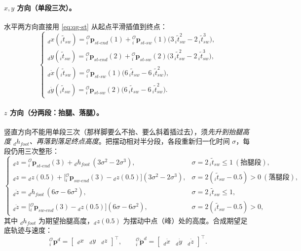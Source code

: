 \paragraph{$x,y$ 方向（单段三次）。}
水平两方向直接用 \cref{eq:qg-st} 从起点平滑插值到终点\cite{yu2021quadruped}：
\begin{equation}
  \begin{cases}
  {}_dx({}_i\tilde t_{sw})={}_i^{\mathcal{O}}\boldsymbol{p}_{st\text{-}end}(1)+{}_i^{\mathcal{O}}\boldsymbol{p}_{st\text{-}sw}(1)\big(3\,{}_i\tilde t_{sw}^2-2\,{}_i\tilde t_{sw}^3\big),\\
  {}_dy({}_i\tilde t_{sw})={}_i^{\mathcal{O}}\boldsymbol{p}_{st\text{-}end}(2)+{}_i^{\mathcal{O}}\boldsymbol{p}_{st\text{-}sw}(2)\big(3\,{}_i\tilde t_{sw}^2-2\,{}_i\tilde t_{sw}^3\big),\\
  {}_d\dot x({}_i\tilde t_{sw})={}_i^{\mathcal{O}}\boldsymbol{p}_{st\text{-}sw}(1)\big(6\,{}_i\tilde t_{sw}-6\,{}_i\tilde t_{sw}^2\big),\\
  {}_d\dot y({}_i\tilde t_{sw})={}_i^{\mathcal{O}}\boldsymbol{p}_{st\text{-}sw}(2)\big(6\,{}_i\tilde t_{sw}-6\,{}_i\tilde t_{sw}^2\big).
  \end{cases}
  \label{eq:qg-xy}
\end{equation}

\paragraph{$z$ 方向（分两段：抬腿、落腿）。}
竖直方向不能用单段三次（那样脚要么不抬、要么斜着插过去），须\emph{先升到抬腿高度 ${}_dh_{foot}$、再落到落足终点高度}。把摆动相对半分段，各段重新归一化时间 $\sigma$，每段仍用三次整形\cite{yu2021quadruped}：
\begin{equation}
  \begin{cases}
  {}_dz={}_i^{\mathcal{O}}\boldsymbol{p}_{st\text{-}end}(3)+{}_dh_{foot}\,(3\sigma^2-2\sigma^3), & \sigma=2\,{}_i\tilde t_{sw}\le1\ (\text{抬腿段}),\\[4pt]
  {}_dz={}_dz(0.5)+\big[{}_i^{\mathcal{O}}\boldsymbol{p}_{sw\text{-}end}(3)-{}_dz(0.5)\big](3\sigma^2-2\sigma^3), & \sigma=2({}_i\tilde t_{sw}-0.5)>0\ (\text{落腿段}),\\[4pt]
  {}_d\dot z={}_dh_{foot}\,(6\sigma-6\sigma^2), & \sigma=2\,{}_i\tilde t_{sw}\le1,\\[4pt]
  {}_d\dot z=\big[{}_i^{\mathcal{O}}\boldsymbol{p}_{sw\text{-}end}(3)-{}_dz(0.5)\big](6\sigma-6\sigma^2), & \sigma=2({}_i\tilde t_{sw}-0.5)>0,
  \end{cases}
  \label{eq:qg-z}
\end{equation}
其中 ${}_dh_{foot}$ 为期望抬腿高度，${}_dz(0.5)$ 为摆动中点（峰）处的高度。合成期望足底轨迹与速度\cite{yu2021quadruped}：
\begin{equation}
  {}_i^{\mathcal{O}}\boldsymbol{p}^{d}=\begin{bmatrix}{}_dx & {}_dy & {}_dz\end{bmatrix}^\top,
  \qquad
  {}_i^{\mathcal{O}}\dot{\boldsymbol{p}}^{d}=\begin{bmatrix}{}_d\dot x & {}_d\dot y & {}_d\dot z\end{bmatrix}^\top.
  \label{eq:qg-pd}
\end{equation}

